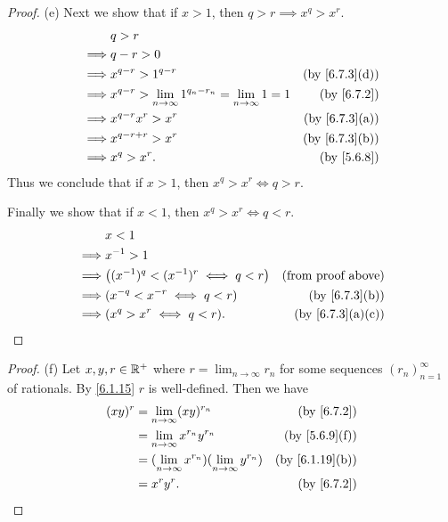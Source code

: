 \begin{proof}{(e)}
  Next we show that if \(x > 1\), then \(q > r \implies x^q > x^r\).
  \begin{align*}
             & q > r                                                                                                   \\
    \implies & q - r > 0                                                                                               \\
    \implies & x^{q - r} > 1^{q - r}                                                     & \text{(by \cref{6.7.3}(d))} \\
    \implies & x^{q - r} > \lim_{n \to \infty} 1^{q_n - r_n} = \lim_{n \to \infty} 1 = 1 & \text{(by \cref{6.7.2})}    \\
    \implies & x^{q - r} x^r > x^r                                                       & \text{(by \cref{6.7.3}(a))} \\
    \implies & x^{q - r + r} > x^r                                                       & \text{(by \cref{6.7.3}(b))} \\
    \implies & x^q > x^r.                                                                & \text{(by \cref{5.6.8})}
  \end{align*}
  Thus we conclude that if \(x > 1\), then \(x^q > x^r \iff q > r\).

  Finally we show that if \(x < 1\), then \(x^q > x^r \iff q < r\).
  \begin{align*}
             & x < 1                                                                         \\
    \implies & x^{-1} > 1                                                                    \\
    \implies & \big((x^{-1})^q < (x^{-1})^r \iff q < r\big) & \text{(from proof above)}      \\
    \implies & (x^{-q} < x^{-r} \iff q < r)                 & \text{(by \cref{6.7.3}(b))}    \\
    \implies & (x^q > x^r \iff q < r).                      & \text{(by \cref{6.7.3}(a)(c))}
  \end{align*}
\end{proof}

\begin{proof}{(f)}
  Let \(x, y, r \in \mathbb{R}^+\) where \(r = \lim_{n \to \infty} r_n\) for some sequences \((r_n)_{n = 1}^\infty\) of rationals.
  By \cref{6.1.15} \(r\) is well-defined.
  Then we have
  \begin{align*}
    (xy)^r & = \lim_{n \to \infty} (xy)^{r_n}                             & \text{(by \cref{6.7.2})}     \\
           & = \lim_{n \to \infty} x^{r_n} y^{r_n}                        & \text{(by \cref{5.6.9}(f))}  \\
           & = (\lim_{n \to \infty} x^{r_n})(\lim_{n \to \infty} y^{r_n}) & \text{(by \cref{6.1.19}(b))} \\
           & = x^r y^r.                                                   & \text{(by \cref{6.7.2})}
  \end{align*}
\end{proof}

